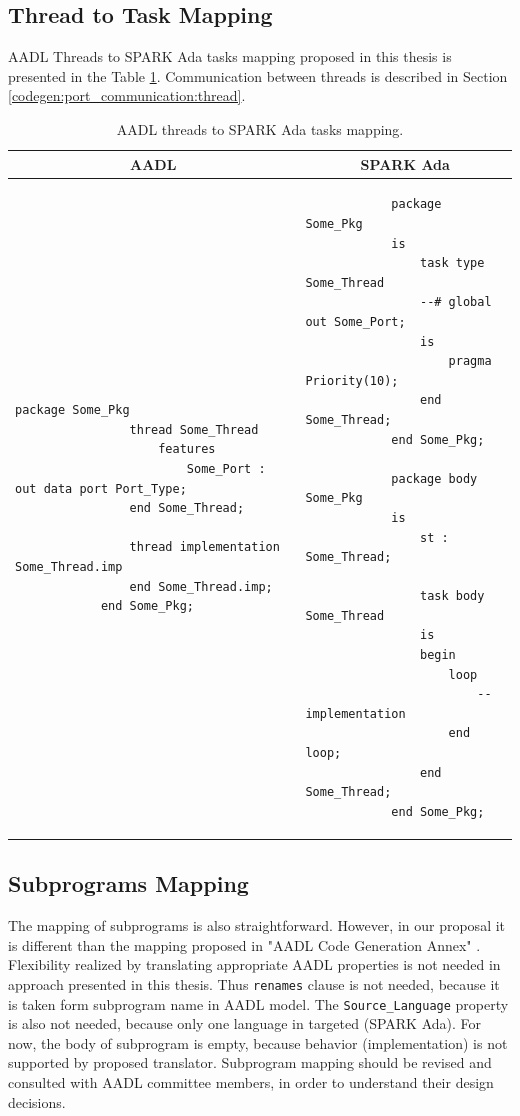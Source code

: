 \subsection{Thread to Task Mapping}
\label{codegen:mapping:threads}

AADL Threads to SPARK Ada tasks mapping proposed in this thesis is presented in the Table \ref{table:threads2tasks}. Communication between threads is described in Section \ref{codegen:port_communication:thread}.

\singlespacing
\begin{table}[!ht]
	\caption{AADL threads to SPARK Ada tasks mapping.}
	\label{table:threads2tasks}
	\centering
  	\begin{tabular}{ | p{3.5in} | p{2.5in} |}

		\hline
		\multicolumn{1}{|c|}{\textbf{AADL}} & \multicolumn{1}{|c|}{\textbf{SPARK Ada}} \\ \hline

		\begin{lstlisting}[language=aadl]
			package Some_Pkg
				thread Some_Thread
					features
						Some_Port : out data port Port_Type;
				end Some_Thread;

				thread implementation Some_Thread.imp
				end Some_Thread.imp;
			end Some_Pkg;
		\end{lstlisting} 
		& 
		\begin{lstlisting}
			package Some_Pkg
			is
				task type Some_Thread
				--# global out Some_Port;
				is
					pragma Priority(10);
				end Some_Thread;
			end Some_Pkg;

			package body Some_Pkg
			is
				st : Some_Thread;

				task body Some_Thread
				is
				begin
					loop
						-- implementation
					end loop;
				end Some_Thread;
			end Some_Pkg;
		\end{lstlisting} 

		\\ \hline
	\end{tabular}
\end{table}
\doublespacing


\subsection{Subprograms Mapping}
\label{codegen:mapping:subprograms}

The mapping of subprograms is also straightforward. However, in our proposal it is different than the mapping proposed in "AADL Code Generation Annex" \cite{AnnexDoc}. Flexibility realized by translating appropriate AADL properties is not needed in approach presented in this thesis. Thus \lstinline{renames} clause is not needed, because it is taken form subprogram name in AADL model. The \lstinline{Source_Language} property is also not needed, because only one language in targeted (SPARK Ada). For now, the body of subprogram is empty, because behavior (implementation) is not supported by proposed translator. Subprogram mapping should be revised and consulted with AADL committee members, in order to understand their design decisions.

